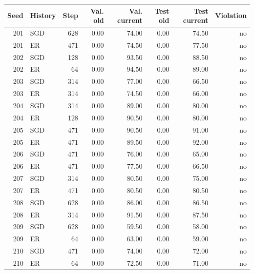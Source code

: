 \begin{tabular}{rlrrrrrr}
\toprule
Seed & History & Step & Val. old & Val. current & Test old & Test current & Violation \\
\midrule
201 & SGD & 628 & 0.00 & 74.00 & 0.00 & 74.50 & no \\
201 & ER & 471 & 0.00 & 74.50 & 0.00 & 77.50 & no \\
202 & SGD & 128 & 0.00 & 93.50 & 0.00 & 88.50 & no \\
202 & ER & 64 & 0.00 & 94.50 & 0.00 & 89.00 & no \\
203 & SGD & 314 & 0.00 & 77.00 & 0.00 & 66.50 & no \\
203 & ER & 314 & 0.00 & 74.50 & 0.00 & 66.00 & no \\
204 & SGD & 314 & 0.00 & 89.00 & 0.00 & 80.00 & no \\
204 & ER & 128 & 0.00 & 90.50 & 0.00 & 80.00 & no \\
205 & SGD & 471 & 0.00 & 90.50 & 0.00 & 91.00 & no \\
205 & ER & 471 & 0.00 & 89.50 & 0.00 & 92.00 & no \\
206 & SGD & 471 & 0.00 & 76.00 & 0.00 & 65.00 & no \\
206 & ER & 471 & 0.00 & 77.50 & 0.00 & 66.50 & no \\
207 & SGD & 314 & 0.00 & 80.50 & 0.00 & 75.00 & no \\
207 & ER & 471 & 0.00 & 80.50 & 0.00 & 80.50 & no \\
208 & SGD & 628 & 0.00 & 86.00 & 0.00 & 86.50 & no \\
208 & ER & 314 & 0.00 & 91.50 & 0.00 & 87.50 & no \\
209 & SGD & 628 & 0.00 & 59.50 & 0.00 & 58.00 & no \\
209 & ER & 64 & 0.00 & 63.00 & 0.00 & 59.00 & no \\
210 & SGD & 471 & 0.00 & 74.00 & 0.00 & 72.00 & no \\
210 & ER & 64 & 0.00 & 72.50 & 0.00 & 71.00 & no \\
\bottomrule
\end{tabular}
